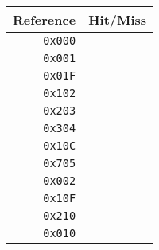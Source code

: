 \begin{question}

\begin{center}
\begin{tabular}{|r|c|}
\hline
Reference & Hit/Miss \\
\hline
\texttt{0x000} &     \\ \hline
\texttt{0x001} &     \\ \hline
\texttt{0x01F} &     \\ \hline
\texttt{0x102} &     \\ \hline
\texttt{0x203} &     \\ \hline
\texttt{0x304} &     \\ \hline
\texttt{0x10C} &     \\ \hline
\texttt{0x705} &     \\ \hline
\texttt{0x002} &     \\ \hline
\texttt{0x10F} &     \\ \hline
\texttt{0x210} &     \\ \hline
\texttt{0x010} &     \\ \hline
\end{tabular}
\end{center}
\end{question}


\begin{question}

\end{question}
